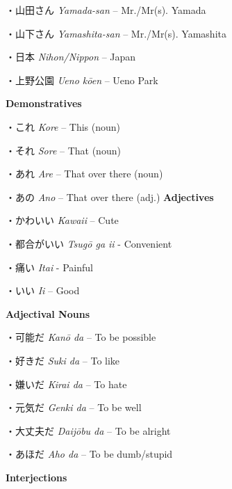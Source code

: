\par{・山田さん \emph{Yamada-san }– Mr.\slash Mr(s). Yamada }

\par{・山下さん \emph{Yamashita-san }– Mr.\slash Mr(s). Yamashita }

\par{・日本 \emph{Nihon\slash Nippon }– Japan }

\par{・上野公園 \emph{Ueno kōen }– Ueno Park }

\par{\textbf{Demonstratives }}

\par{・これ \emph{Kore }– This (noun) }

\par{・それ \emph{Sore }– That (noun) }

\par{・あれ \emph{Are }– That over there (noun) }

\par{・あの \emph{Ano }– That over there (adj.) }
  \textbf{Adjectives }
\par{・かわいい \emph{Kawaii }– Cute }

\par{・都合がいい \emph{Tsugō ga ii }- Convenient }

\par{・痛い \emph{Itai }- Painful }

\par{・いい \emph{Ii }– Good }

\par{\textbf{Adjectival Nouns }}

\par{・可能だ \emph{Kanō da }– To be possible }

\par{・好きだ \emph{Suki da }– To like }

\par{・嫌いだ \emph{Kirai da }– To hate }

\par{・元気だ \emph{Genki da }– To be well }

\par{・大丈夫だ \emph{Daijōbu da }– To be alright }

\par{・あほだ \emph{Aho da }– To be dumb\slash stupid }

\par{\textbf{Interjections }}

